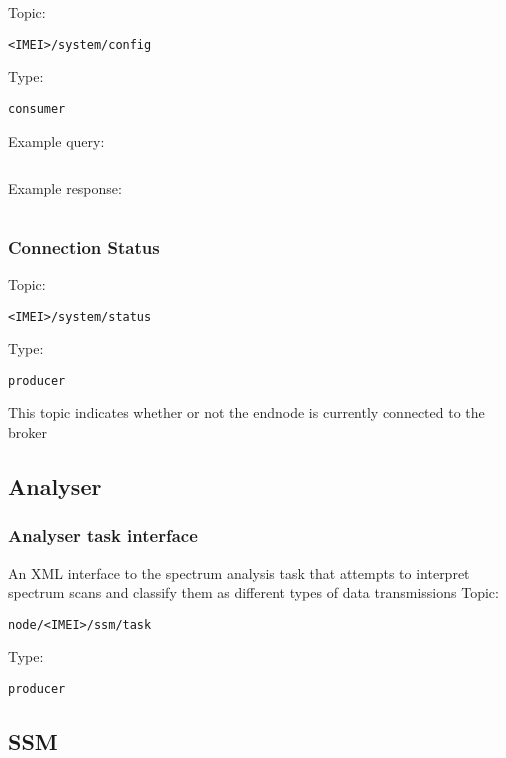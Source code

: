 Topic:
\begin{lstlisting}<IMEI>/system/config\end{lstlisting}
Type:
\begin{lstlisting}consumer\end{lstlisting}
Example query:
\begin{lstlisting}\end{lstlisting}
Example response:
\begin{lstlisting}\end{lstlisting}

\subsubsection{Connection Status}

Topic:
\begin{lstlisting}<IMEI>/system/status\end{lstlisting}
Type:
\begin{lstlisting}producer\end{lstlisting}
    
This topic indicates whether or not the endnode is currently connected to the broker
\subsection{Analyser}

\subsubsection{Analyser task interface}
An XML interface to the spectrum analysis task that attempts to interpret spectrum scans and classify them as different types of data transmissions
Topic:
\begin{lstlisting}node/<IMEI>/ssm/task\end{lstlisting}
Type:
\begin{lstlisting}producer\end{lstlisting}

\subsection{SSM}

